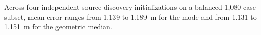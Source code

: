 Across four independent source-discovery initializations on a balanced 1,080-case subset, mean error ranges from 1.139 to 1.189~m for the mode and from 1.131 to 1.151~m for the geometric median.

